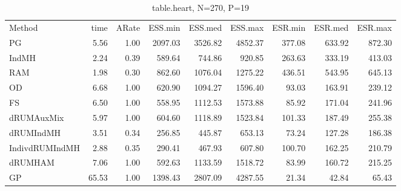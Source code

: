 \begin{table}
\label{tab:blogit-heart}
\begin{tabular}{l r r r r r r r r } 
          Method  &     time &    ARate &  ESS.min &  ESS.med &  ESS.max &  ESR.min &  ESR.med &  ESR.max \\ 
              PG  &     5.56 &     1.00 &  2097.03 &  3526.82 &  4852.37 &   377.08 &   633.92 &   872.30 \\ 
           IndMH  &     2.24 &     0.39 &   589.64 &   744.86 &   920.85 &   263.63 &   333.19 &   413.03 \\ 
             RAM  &     1.98 &     0.30 &   862.60 &  1076.04 &  1275.22 &   436.51 &   543.95 &   645.13 \\ 
              OD  &     6.68 &     1.00 &   620.90 &  1094.27 &  1596.40 &    93.03 &   163.91 &   239.12 \\ 
              FS  &     6.50 &     1.00 &   558.95 &  1112.53 &  1573.88 &    85.92 &   171.04 &   241.96 \\ 
      dRUMAuxMix  &     5.97 &     1.00 &   604.60 &  1118.89 &  1523.84 &   101.33 &   187.49 &   255.38 \\ 
       dRUMIndMH  &     3.51 &     0.34 &   256.85 &   445.87 &   653.13 &    73.24 &   127.28 &   186.38 \\ 
  IndivdRUMIndMH  &     2.88 &     0.35 &   290.41 &   467.93 &   607.80 &   100.70 &   162.25 &   210.79 \\ 
         dRUMHAM  &     7.06 &     1.00 &   592.63 &  1133.59 &  1518.72 &    83.99 &   160.72 &   215.25 \\ 
              GP  &    65.53 &     1.00 &  1398.43 &  2807.09 &  4287.55 &    21.34 &    42.84 &    65.43
 \end{tabular}
\caption{table.heart, N=270, P=19}
\end{table}

